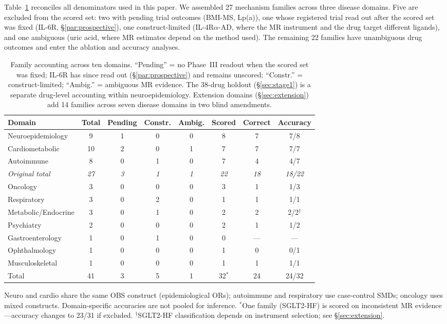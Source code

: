 \documentclass[11pt]{article}
\begin{document}
Table~\ref{tab:accounting} reconciles all denominators used in this paper. We assembled 27 mechanism families across three disease domains. Five are excluded from the scored set: two with pending trial outcomes (BMI-MS, Lp(a)), one whose registered trial read out after the scored set was fixed (IL-6R, \S\ref{par:prospective}), one construct-limited (IL-4R$\alpha$-AD, where the MR instrument and the drug target different ligands), and one ambiguous (uric acid, where MR estimates depend on the method used). The remaining 22 families have unambiguous drug outcomes and enter the ablation and accuracy analyses.

\begin{table}[t]
\centering
\caption{Family accounting across ten domains. ``Pending'' = no Phase~III readout when the scored set was fixed; IL-6R has since read out (\S\ref{par:prospective}) and remains unscored; ``Constr.'' = construct-limited; ``Ambig.'' = ambiguous MR evidence. The 38-drug holdout (\S\ref{sec:stage1}) is a separate drug-level accounting within neuroepidemiology. Extension domains (\S\ref{sec:extension}) add 14 families across seven disease domains in two blind amendments.}
\label{tab:accounting}
\small
\begin{tabular}{lccccccc}
\toprule
Domain & Total & Pending & Constr. & Ambig. & Scored & Correct & Accuracy \\
\midrule
Neuroepidemiology & 9 & 1 & 0 & 0 & 8 & 7 & 7/8 \\
Cardiometabolic & 10 & 2 & 0 & 1 & 7 & 7 & 7/7 \\
Autoimmune & 8 & 0 & 1 & 0 & 7 & 4 & 4/7 \\
\midrule
\emph{Original total} & \emph{27} & \emph{3} & \emph{1} & \emph{1} & \emph{22} & \emph{18} & \emph{18/22} \\
\midrule
Oncology & 3 & 0 & 0 & 0 & 3 & 1 & 1/3 \\
Respiratory & 3 & 0 & 2 & 0 & 1 & 1 & 1/1 \\
Metabolic/Endocrine & 3 & 0 & 1 & 0 & 2 & 2 & 2/2$^\dagger$ \\
Psychiatry & 2 & 0 & 0 & 0 & 2 & 1 & 1/2 \\
Gastroenterology & 1 & 0 & 1 & 0 & 0 & --- & --- \\
Ophthalmology & 1 & 0 & 0 & 0 & 1 & 0 & 0/1 \\
Musculoskeletal & 1 & 0 & 0 & 0 & 1 & 1 & 1/1 \\
\midrule
Total & 41 & 3 & 5 & 1 & 32$^*$ & 24 & 24/32 \\
\bottomrule
\end{tabular}

\vspace{1mm}
{\footnotesize
Neuro and cardio share the same OBS construct (epidemiological ORs); autoimmune and respiratory use case-control SMDs; oncology uses mixed constructs. Domain-specific accuracies are not pooled for inference. $^*$One family (SGLT2-HF) is scored on inconsistent MR evidence---accuracy changes to 23/31 if excluded. $^\dagger$SGLT2-HF classification depends on instrument selection; see \S\ref{sec:extension}.}
\end{table}
\end{document}
